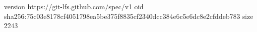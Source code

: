 version https://git-lfs.github.com/spec/v1
oid sha256:75c03e8178cf4051798ea5be375f8835cf2340dcc384e6c5e6dc8e2cfddeb783
size 2243
